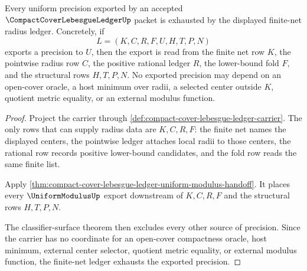 \begin{theorem}
\label{thm:compact-cover-lebesgue-ledger-finite-net-radius-exhaustion}
Every uniform precision exported by an accepted $\CompactCoverLebesgueLedgerUp$ packet is exhausted by the displayed finite-net radius ledger. Concretely, if
$$
L=(K,C,R,F,U,H,T,P,N)
$$
exports a precision to $U$, then the export is read from the finite net row $K$, the pointwise radius row $C$, the positive rational ledger $R$, the lower-bound fold $F$, and the structural rows $H,T,P,N$. No exported precision may depend on an open-cover oracle, a host minimum over radii, a selected center outside $K$, quotient metric equality, or an external modulus function.
\end{theorem}
\begin{proof}
Project the carrier through \autoref{def:compact-cover-lebesgue-ledger-carrier}. The only rows that can supply radius data are $K,C,R,F$: the finite net names the displayed centers, the pointwise ledger attaches local radii to those centers, the rational row records positive lower-bound candidates, and the fold row reads the same finite list.

Apply \autoref{thm:compact-cover-lebesgue-ledger-uniform-modulus-handoff}. It places every $\UniformModulusUp$ export downstream of $K,C,R,F$ and the structural rows $H,T,P,N$.

The classifier-surface theorem then excludes every other source of precision. Since the carrier has no coordinate for an open-cover compactness oracle, host minimum, external center selector, quotient metric equality, or external modulus function, the finite-net ledger exhausts the exported precision.
\end{proof}



